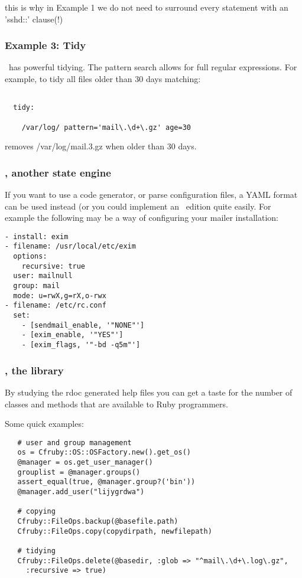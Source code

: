 this is why in Example 1 we do not need to surround every statement
with an 'sshd::' clause(!)

\subsubsection*{Example 3: Tidy}

\cfenjin\ has powerful tidying. The pattern search allows for full
regular expressions. For example, to tidy all files older than 30 days
matching:

\begin{verbatim}

  tidy:

    /var/log/ pattern='mail\.\d+\.gz' age=30
\end{verbatim}

removes /var/log/mail.3.gz when older than 30 days.

\subsubsection{\cfyaml, another state engine}

If you want to use a code generator, or parse configuration files,
a YAML format can be used instead (or you could implement an \xml\ edition
quite easily. For example the following may be a way of configuring
your mailer installation:

\begin{verbatim}
- install: exim
- filename: /usr/local/etc/exim
  options:
    recursive: true
  user: mailnull
  group: mail
  mode: u=rwX,g=rX,o-rwx
- filename: /etc/rc.conf
  set:
    - [sendmail_enable, '"NONE"']
    - [exim_enable, '"YES"']
    - [exim_flags, '"-bd -q5m"']
\end{verbatim}

\subsubsection{\libcfruby, the library}

By studying the rdoc generated help files you can get a taste for the
number of classes and methods that are available to Ruby programmers.

Some quick examples:

\scriptsize
\begin{verbatim}
   # user and group management
   os = Cfruby::OS::OSFactory.new().get_os()
   @manager = os.get_user_manager() 
   grouplist = @manager.groups()
   assert_equal(true, @manager.group?('bin'))
   @manager.add_user("lijygrdwa")

   # copying
   Cfruby::FileOps.backup(@basefile.path)
   Cfruby::FileOps.copy(copydirpath, newfilepath)

   # tidying
   Cfruby::FileOps.delete(@basedir, :glob => "^mail\.\d+\.log\.gz", 
     :recursive => true)

\end{verbatim}
\normalsize

